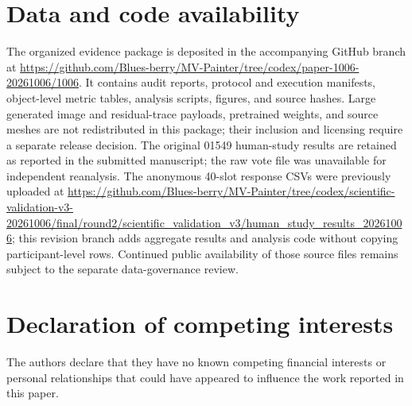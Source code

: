 \documentclass[times,twocolumn,final]{elsarticle}
\begin{document}
\section*{Data and code availability}

The organized evidence package is deposited in the accompanying GitHub branch at \url{https://github.com/Blues-berry/MV-Painter/tree/codex/paper-1006-20261006/1006}. It contains audit reports, protocol and execution manifests, object-level metric tables, analysis scripts, figures, and source hashes. Large generated image and residual-trace payloads, pretrained weights, and source meshes are not redistributed in this package; their inclusion and licensing require a separate release decision. The original 01549 human-study results are retained as reported in the submitted manuscript; the raw vote file was unavailable for independent reanalysis. The anonymous 40-slot response CSVs were previously uploaded at \url{https://github.com/Blues-berry/MV-Painter/tree/codex/scientific-validation-v3-20261006/final/round2/scientific_validation_v3/human_study_results_20261006}; this revision branch adds aggregate results and analysis code without copying participant-level rows. Continued public availability of those source files remains subject to the separate data-governance review.

\section*{Declaration of competing interests}
The authors declare that they have no known competing financial interests or personal relationships that could have appeared to influence the work reported in this paper.
\end{document}
